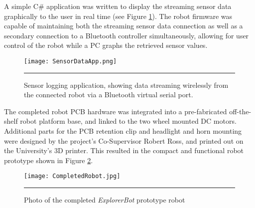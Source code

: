 

A simple C\# application was written to display the streaming sensor data graphically to the user in real time (see Figure \ref{fig:sensorhostapp}). The robot firmware was capable of maintaining both the streaming sensor data connection as well as a secondary connection to a Bluetooth controller simultaneously, allowing for user control of the robot while a PC graphs the retrieved sensor values.

\begin{figure}[tbph]
	\vspace{1em}
	\centering
		\texttt{[image: SensorDataApp.png]}
	\rule{35em}{0.5pt}
	\caption[Sensor Logging Host Application]{Sensor logging application, showing data streaming wirelessly from the connected robot via a Bluetooth virtual serial port. }
	\label{fig:sensorhostapp}
\end{figure}

The completed robot PCB hardware was integrated into a pre-fabricated off-the-shelf robot platform base, and linked to the two wheel mounted DC motors. Additional parts for the PCB retention clip and headlight and horn mounting were designed by the project's Co-Supervisor Robert Ross, and printed out on the University's 3D printer. This resulted in the compact and functional robot prototype shown in Figure \ref{fig:completedrobot}.

\begin{figure}[tbph]
	\vspace{1em}
	\centering
		\texttt{[image: CompletedRobot.jpg]}
	\rule{35em}{0.5pt}
	\caption[Photo of Completed Robot]{Photo of the completed \textit{ExplorerBot} prototype robot}
	\label{fig:completedrobot}
\end{figure}
